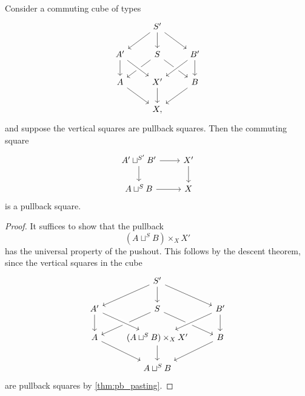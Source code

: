 
\begin{thm}
Consider a commuting cube of types 
\begin{equation*}\label{eq:cube}
\begin{tikzcd}
& S' \arrow[dl] \arrow[dr] \arrow[d] \\
A' \arrow[d] & S \arrow[dl] \arrow[dr] & B' \arrow[dl,crossing over] \arrow[d] \\
A \arrow[dr] & X' \arrow[d] \arrow[from=ul,crossing over] & B \arrow[dl] \\
& X,
\end{tikzcd}
\end{equation*}
and suppose the vertical squares are pullback squares. Then the commuting square
\begin{equation*}
\begin{tikzcd}
A' \sqcup^{S'} B' \arrow[r] \arrow[d] & X' \arrow[d] \\
A\sqcup^{S} B \arrow[r] & X
\end{tikzcd}
\end{equation*}
is a pullback square.
\end{thm}

\begin{proof}
It suffices to show that the pullback 
\begin{equation*}
(A\sqcup^{S} B)\times_{X}X'
\end{equation*}
has the universal property of the pushout. This follows by the descent theorem, since the vertical squares in the cube
\begin{equation*}
\begin{tikzcd}
& S' \arrow[dl] \arrow[dr] \arrow[d] \\
A' \arrow[d] & S \arrow[dl] \arrow[dr] & B' \arrow[dl,crossing over] \arrow[d] \\
A \arrow[dr] & (A\sqcup^{S} B)\times_{X}X' \arrow[d] \arrow[from=ul,crossing over] & B \arrow[dl] \\
& A\sqcup^{S} B
\end{tikzcd}
\end{equation*}
are pullback squares by \cref{thm:pb_pasting}.
\end{proof}


